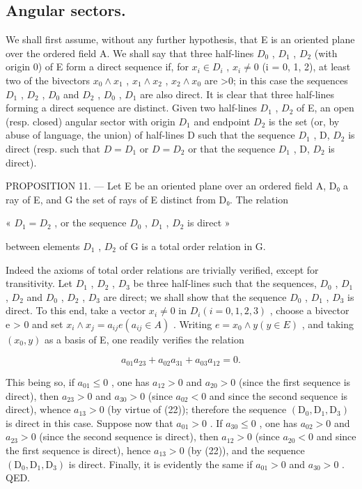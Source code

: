 \subsection{Angular sectors.}

We shall first assume, without any further hypothesis, that E is an oriented plane over the ordered field A. We shall say that three half-lines \(D_{0}\) , \(D_{1}\) , \(D_{2}\) (with origin 0) of E form a direct sequence if, for \(x_{i} \in D_{i}\) , \(x_{i} \neq 0\) (i = 0, 1, 2), at least two of the bivectors \(x_{0} \wedge x_{1}\) , \(x_{1} \wedge x_{2}\) , \(x_{2} \wedge x_{0}\) are \textgreater0; in this case the sequences \(D_{1}\) , \(D_{2}\) , \(D_{0}\) and \(D_{2}\) , \(D_{0}\) , \(D_{1}\) are also direct. It is clear that three half-lines forming a direct sequence are distinct. Given two half-lines \(D_{1}\) , \(D_{2}\) of E, an open (resp. closed) angular sector with origin \(D_{1}\) and endpoint \(D_{2}\) is the set (or, by abuse of language, the union) of half-lines D such that the sequence \(D_{1}\) , D, \(D_{2}\) is direct (resp. such that \(D = D_{1}\) or \(D = D_{2}\) or that the sequence \(D_{1}\) , D, \(D_{2}\) is direct).

PROPOSITION 11. --- Let E be an oriented plane over an ordered field A, D₀ a ray of E, and G the set of rays of E distinct from D₀. The relation

« \(D_{1} = D_{2}\) , or the sequence \(D_{0}\) , \(D_{1}\) , \(D_{2}\) is direct »

between elements \(D_{1}\) , \(D_{2}\) of G is a total order relation in G.

Indeed the axioms of total order relations are trivially verified, except for transitivity. Let \(D_{1}\) , \(D_{2}\) , \(D_{3}\) be three half-lines such that the sequences, \(D_{0}\) , \(D_{1}\) , \(D_{2}\) and \(D_{0}\) , \(D_{2}\) , \(D_{3}\) are direct; we shall show that the sequence \(D_{0}\) , \(D_{1}\) , \(D_{3}\) is direct. To this end, take a vector \(x_{i} \neq 0\) in \(D_{i} (i = 0, 1, 2, 3)\) , choose a bivector e \textgreater{} 0 and set \(x_{i} \wedge x_{j} = a_{ij} e (a_{ij} \in A)\) . Writing \(e = x_{0} \wedge y (y \in E)\) , and taking \((x_{0}, y)\) as a basis of E, one readily verifies the relation

\[
a _ {0 1} a _ {2 3} + a _ {0 2} a _ {3 1} + a _ {0 3} a _ {1 2} = 0.\tag{22}
\]

This being so, if \(a_{01} \leqslant 0\) , one has \(a_{12} > 0\) and \(a_{20} > 0\) (since the first sequence is direct), then \(a_{23} > 0\) and \(a_{30} > 0\) (since \(a_{02} < 0\) and since the second sequence is direct), whence \(a_{13} > 0\) (by virtue of (22)); therefore the sequence \((\mathrm{D}_0, \mathrm{D}_1, \mathrm{D}_3)\) is direct in this case. Suppose now that \(a_{01} > 0\) . If \(a_{30} \leqslant 0\) , one has \(a_{02} > 0\) and \(a_{23} > 0\) (since the second sequence is direct), then \(a_{12} > 0\) (since \(a_{20} < 0\) and since the first sequence is direct), hence \(a_{13}>0\) (by (22)), and the sequence \((\mathrm{D}_{0}, \mathrm{D}_{1}, \mathrm{D}_{3})\) is direct. Finally, it is evidently the same if \(a_{01}>0\) and \(a_{30}>0\) . QED.

